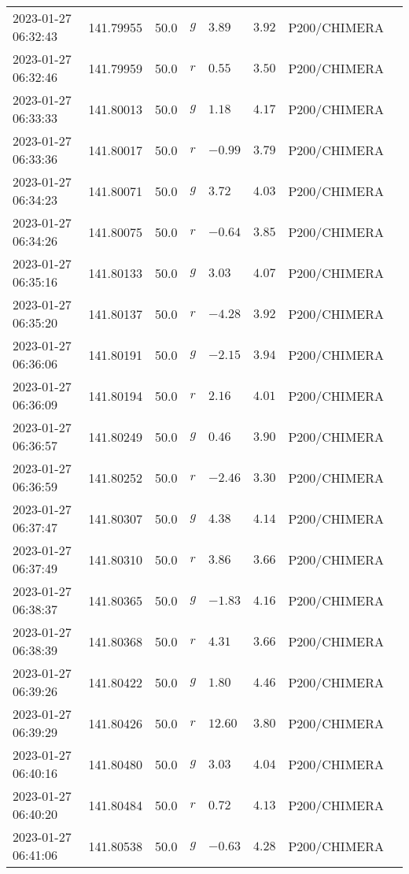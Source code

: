 \documentclass{nature_plusfigure}
\begin{document}
\begin{supplement}
\begin{center}
\begin{longtable}{llllllll}
2023-01-27 06:32:43 & 141.79955 & 50.0 & $g$ & $3.89$ & $3.92$ & P200/CHIMERA &  \\ 
2023-01-27 06:32:46 & 141.79959 & 50.0 & $r$ & $0.55$ & $3.50$ & P200/CHIMERA &  \\ 
2023-01-27 06:33:33 & 141.80013 & 50.0 & $g$ & $1.18$ & $4.17$ & P200/CHIMERA &  \\ 
2023-01-27 06:33:36 & 141.80017 & 50.0 & $r$ & $-0.99$ & $3.79$ & P200/CHIMERA &  \\ 
2023-01-27 06:34:23 & 141.80071 & 50.0 & $g$ & $3.72$ & $4.03$ & P200/CHIMERA &  \\ 
2023-01-27 06:34:26 & 141.80075 & 50.0 & $r$ & $-0.64$ & $3.85$ & P200/CHIMERA &  \\ 
2023-01-27 06:35:16 & 141.80133 & 50.0 & $g$ & $3.03$ & $4.07$ & P200/CHIMERA &  \\ 
2023-01-27 06:35:20 & 141.80137 & 50.0 & $r$ & $-4.28$ & $3.92$ & P200/CHIMERA &  \\ 
2023-01-27 06:36:06 & 141.80191 & 50.0 & $g$ & $-2.15$ & $3.94$ & P200/CHIMERA &  \\ 
2023-01-27 06:36:09 & 141.80194 & 50.0 & $r$ & $2.16$ & $4.01$ & P200/CHIMERA &  \\ 
2023-01-27 06:36:57 & 141.80249 & 50.0 & $g$ & $0.46$ & $3.90$ & P200/CHIMERA &  \\ 
2023-01-27 06:36:59 & 141.80252 & 50.0 & $r$ & $-2.46$ & $3.30$ & P200/CHIMERA &  \\ 
2023-01-27 06:37:47 & 141.80307 & 50.0 & $g$ & $4.38$ & $4.14$ & P200/CHIMERA &  \\ 
2023-01-27 06:37:49 & 141.80310 & 50.0 & $r$ & $3.86$ & $3.66$ & P200/CHIMERA &  \\ 
2023-01-27 06:38:37 & 141.80365 & 50.0 & $g$ & $-1.83$ & $4.16$ & P200/CHIMERA &  \\ 
2023-01-27 06:38:39 & 141.80368 & 50.0 & $r$ & $4.31$ & $3.66$ & P200/CHIMERA &  \\ 
2023-01-27 06:39:26 & 141.80422 & 50.0 & $g$ & $1.80$ & $4.46$ & P200/CHIMERA &  \\ 
2023-01-27 06:39:29 & 141.80426 & 50.0 & $r$ & $12.60$ & $3.80$ & P200/CHIMERA &  \\ 
2023-01-27 06:40:16 & 141.80480 & 50.0 & $g$ & $3.03$ & $4.04$ & P200/CHIMERA &  \\ 
2023-01-27 06:40:20 & 141.80484 & 50.0 & $r$ & $0.72$ & $4.13$ & P200/CHIMERA &  \\ 
2023-01-27 06:41:06 & 141.80538 & 50.0 & $g$ & $-0.63$ & $4.28$ & P200/CHIMERA &  \\ 

\end{longtable}
\end{center}
\end{supplement}
\end{document}
